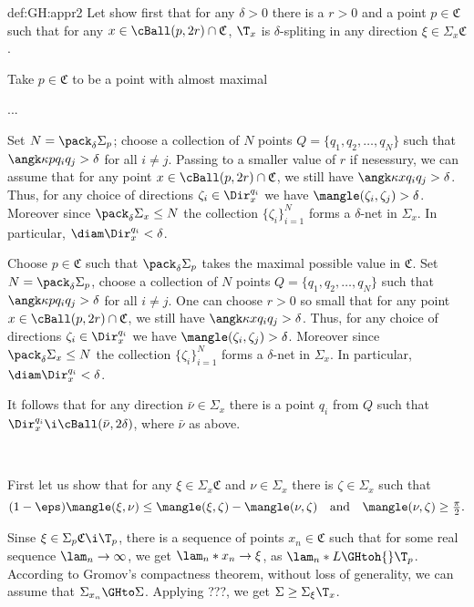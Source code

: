{\begin{subthm}{def:GH:appr2}
Let show first that for any $\delta>0$ there is a $r>0$ and a point $p\in \mathfrak C$ such that for any $x\in\cBall(p,2r)\cap \mathfrak C$,
$\T_x$ is $\delta$-spliting in any direction $\xi\in\Sigma_x\mathfrak C$.

Take $p\in\mathfrak C$ to be a point with almost maximal  


...

Set $N=\pack_\delta\Sigma_p$;
choose a collection of $N$ points $Q=\{q_1,q_2,\dots,q_N\}$ such that $\angk\kappa p{q_i}{q_j}>\delta$ for all $i\not=j$.
Passing to a smaller value of $r$ if nesessury,
we can assume that for any point $x\in\cBall(p,2r)\cap\mathfrak C$, 
we still have $\angk\kappa x {q_i} {q_j}>\delta$.
Thus, for any choice of directions $\zeta_i\in \Dir_x^{q_i}$ we have $\mangle(\zeta_i,\zeta_j)>\delta$.
Moreover since $\pack_\delta\Sigma_x\le N$ the collection $\{\zeta_i\}_{i=1}^N$ forms a $\delta$-net in $\Sigma_x$.
In particular, $\diam\Dir_x^{q_i}<\delta$.




Choose $p\in\mathfrak C$ such that $\pack_\delta\Sigma_p$ takes the maximal possible value in $\mathfrak C$. 
Set $N=\pack_\delta\Sigma_p$,
choose a collection of $N$ points $Q=\{q_1,q_2,\dots,q_N\}$ such that $\angk\kappa p{q_i}{q_j}>\delta$ for all $i\not=j$.
One can choose $r>0$ so small that for any point $x\in\cBall(p,2r)\cap\mathfrak C$, 
we still have $\angk\kappa x {q_i} {q_j}>\delta$.
Thus, for any choice of directions $\zeta_i\in \Dir_x^{q_i}$ we have $\mangle(\zeta_i,\zeta_j)>\delta$.
Moreover since $\pack_\delta\Sigma_x\le N$ the collection $\{\zeta_i\}_{i=1}^N$ forms a $\delta$-net in $\Sigma_x$.
In particular, $\diam\Dir_x^{q_i}<\delta$.

It follows that for any direction $\bar\nu\in \Sigma_x$  there is a point $q_i$ from $Q$ such that $\Dir_x^{q_i}\i \cBall(\bar\nu,2\delta)$, where $\bar\nu$ as above.

\ 


First let us show that for any $\xi\in \Sigma_x\mathfrak C$ 
and $\nu\in\Sigma_x$ there is $\zeta\in \Sigma_x$ such that 
$$
(1-\eps)\mangle(\xi,\nu)
\le \mangle(\xi,\zeta)-\mangle(\nu,\zeta)\ \ \
\text{and}\ \ \ \mangle(\nu,\zeta)\ge\tfrac\pi2.$$

Sinse $\xi\in\Sigma_p\mathfrak C\i \T_p$, there is a sequence of points $x_n\in \mathfrak C$ such that for some real sequence $\lam_n\to\infty$, we get $\lam_n*x_n\to \xi$, as $\lam_n*L\GHtoh{}\T_p$.
According to Gromov's compactness theorem,
without loss of generality, 
we can assume that $\Sigma_{x_n}\GHto \Sigma$.
Applying ???, we get $\Sigma\ge \Sigma_\xi\T_x$.


\end{subthm}}
